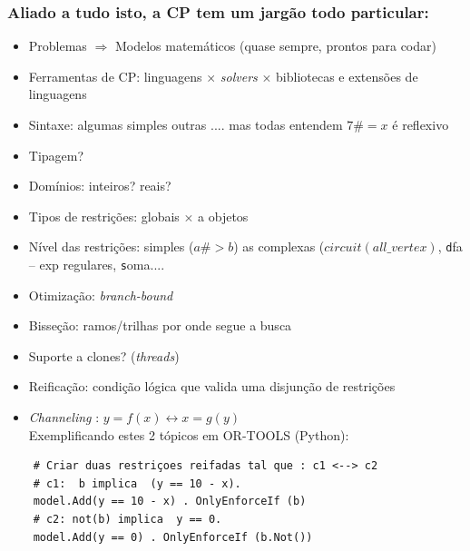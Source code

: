 \documentclass{beamer}
\begin{document}


\begin{frame}[fragile, allowframebreaks=0.9]

  \frametitle{Aliado a tudo isto, a CP tem um jargão todo particular:}

\begin{itemize}
    \item Problemas $\Rightarrow$ Modelos matemáticos (quase sempre, prontos para codar)
    \item Ferramentas de CP: linguagens $\times$ {\em solvers }  $\times$ bibliotecas e extensões de linguagens
    \item Sintaxe: algumas simples outras .... mas todas entendem {\bf $ 7 \#\!\!= x $} é reflexivo
    
    \item Tipagem?
    \item Domínios: inteiros? reais?
    \item Tipos de restrições: globais $\times$ a objetos
    \item Nível das restrições: simples ($a \#\!\!> b$) as complexas ($circuit (all\_vertex)$, {\texttt dfa -- exp regulares}, {\texttt soma}....
    
    \item Otimização: {\em branch-bound}
    
    \item Bisseção: ramos/trilhas por onde segue a busca
    
     \item Suporte a clones? ({\em threads})
    
    \item Reificação: condição lógica que valida uma disjunção de restrições
    
    \item {\em Channeling} : $y=f(x) \leftrightarrow x = g(y)$\\
    Exemplificando estes 2 tópicos em OR-TOOLS (Python):
  
\end{itemize}

   \begin{verbatim}
    # Criar duas restriçoes reifadas tal que : c1 <--> c2
    # c1:  b implica  (y == 10 - x).
    model.Add(y == 10 - x) . OnlyEnforceIf (b)
    # c2: not(b) implica  y == 0.
    model.Add(y == 0) . OnlyEnforceIf (b.Not())
    \end{verbatim}
   

\end{frame}
\end{document}
